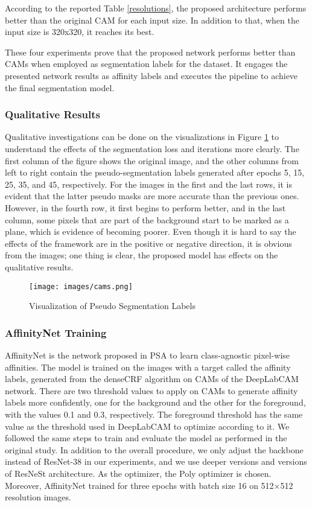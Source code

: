 \documentclass[sn-mathphys]{sn-jnl}
\theoremstyle{thmstyleone}
\theoremstyle{thmstyletwo}\newtheorem{example}{Example}\newtheorem{remark}{Remark}
\theoremstyle{thmstylethree}\newtheorem{definition}{Definition}
\begin{document}
According to the reported Table \ref{resolutions}, the proposed architecture performs better than the original CAM for each input size. In addition to that, when the input size is 320x320, it reaches its best.


These four experiments prove that the proposed network performs better than CAMs when employed as segmentation labels for the dataset. It engages the presented network results as affinity labels and executes the pipeline to achieve the final segmentation model.  


\subsubsection{Qualitative Results}

Qualitative investigations can be done on the visualizations in Figure \ref{pseudo_labels} to understand the effects of the segmentation loss and iterations more clearly. The first column of the figure shows the original image, and the other columns from left to right contain the pseudo-segmentation labels generated after epochs 5, 15, 25, 35, and 45, respectively. For the images in the first and the last rows, it is evident that the latter pseudo masks are more accurate than the previous ones. However, in the fourth row, it first begins to perform better, and in the last column, some pixels that are part of the background start to be marked as a plane, which is evidence of becoming poorer. Even though it is hard to say the effects of the framework are in the positive or negative direction, it is obvious from the images; one thing is clear, the proposed model has effects on the qualitative results. 

\begin{figure}[!ht]
    \centering
    \texttt{[image: images/cams.png]}
    \caption{Visualization of Pseudo Segmentation Labels}
    \label{pseudo_labels}
\end{figure}

\subsubsection{AffinityNet Training}

AffinityNet is the network proposed in PSA to learn class-agnostic pixel-wise affinities. The model is trained on the images with a target called the affinity labels, generated from the denseCRF algorithm on CAMs of the DeepLabCAM network. There are two threshold values to apply on CAMs to generate affinity labels more confidently, one for the background and the other for the foreground, with the values 0.1 and 0.3, respectively. The foreground threshold has the same value as the threshold used in DeepLabCAM to optimize according to it. We followed the same steps to train and evaluate the model as performed in the original study. In addition to the overall procedure, we only adjust the backbone instead of ResNet-38 in our experiments, and we use deeper versions and versions of ResNeSt architecture. As the optimizer, the Poly optimizer is chosen. Moreover, AffinityNet trained for three epochs with batch size 16 on 512×512 resolution images.
\end{document}
